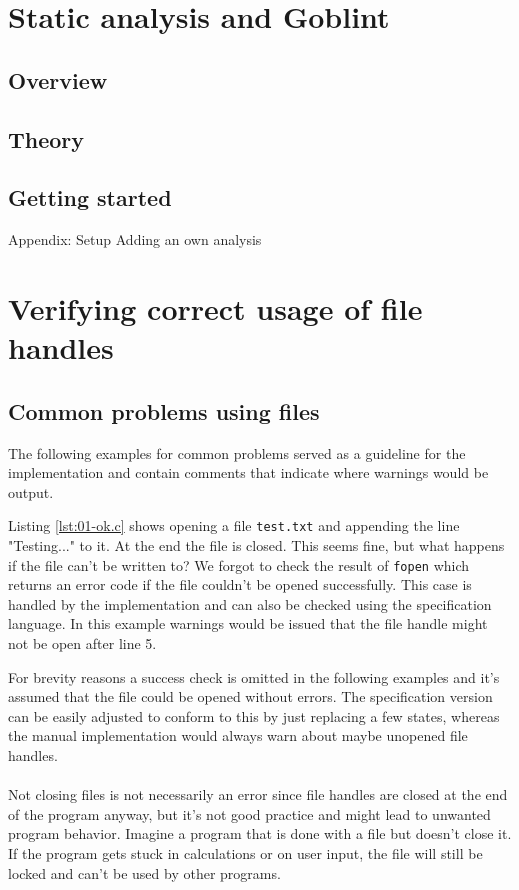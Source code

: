 


\chapter{Static analysis and Goblint}
\section{Overview}

\section{Theory}

\section{Getting started}
Appendix: Setup
Adding an own analysis


\chapter{Verifying correct usage of file handles}
\section{Common problems using files}
The following examples for common problems served as a guideline for the implementation and contain comments that indicate where warnings would be output.

Listing \ref{lst:01-ok.c} shows opening a file \verb|test.txt| and appending the line "Testing..." to it. At the end the file is closed.
This seems fine, but what happens if the file can't be written to?
We forgot to check the result of \verb|fopen| which returns an error code if the file couldn't be opened successfully.
This case is handled by the implementation and can also be checked using the specification language. In this example warnings would be issued that the file handle might not be open after line 5.

For brevity reasons a success check is omitted in the following examples and it's assumed that the file could be opened without errors. The specification version can be easily adjusted to conform to this by just replacing a few states, whereas the manual implementation would always warn about maybe unopened file handles.
\\\\
Not closing files is not necessarily an error since file handles are closed at the end of the program anyway, but it's not good practice and might lead to unwanted program behavior.
Imagine a program that is done with a file but doesn't close it. If the program gets stuck in calculations or on user input, the file will still be locked and can't be used by other programs.

